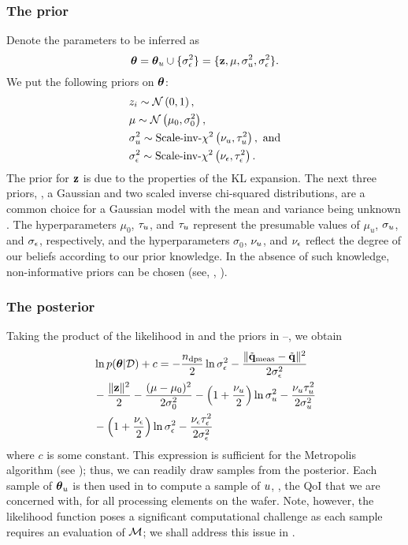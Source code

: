 \subsubsection{The prior}
Denote the parameters to be inferred as
\[
  {\boldsymbol\theta} = {\boldsymbol\theta}_u \cup \{ \sigma_\epsilon^2 \} = \{ \mathbf{z}, \mu, \sigma_u^2, \sigma_\epsilon^2 \}.
\]
We put the following priors on ${\boldsymbol\theta}$:
\begin{align}
  & \z_i \sim \gaussian{0}{1}, \elabel{z-prior} \\
  & \mu \sim \gaussian{\mu_0}{\sigma^2_0}, \elabel{mu-u-prior} \\
  & \sigma^2_\u \sim \sichisquared{\nu_\u}{\tau^2_\u}, \text{ and} \elabel{sigma2-u-prior} \\
  & \sigma^2_\noise \sim \sichisquared{\nu_\noise}{\tau^2_\noise}. \elabel{sigma2-noise-prior}
\end{align}
The prior for $\mathbf{z}$ is due to the properties of the KL expansion. The next three priors, \ie, a Gaussian and two scaled inverse chi-squared distributions, are a common choice for a Gaussian model with the mean and variance being unknown \cite{gelman2004}. The hyperparameters $\mu_0$, $\tau_u$, and $\tau_u$ represent the presumable values of $\mu_u$, $\sigma_u$, and $\sigma_\epsilon$, respectively, and the hyperparameters $\sigma_0$, $\nu_u$, and $\nu_\epsilon$ reflect the degree of our beliefs according to our prior knowledge. In the absence of such knowledge, non-informative priors can be chosen (see, \eg, \cite{gelman2004}).

\subsubsection{The posterior}
Taking the product of the likelihood in  and the priors in --, we obtain
\begin{align}
  & \ln \f{\vparam | \Data} + c = -\frac{\ndps}{2} \ln \sigma^2_\noise - \frac{\norm{\mvT_\meas - \mvT}^2}{2 \sigma^2_\noise} \nonumber \\
  & {} - \frac{\norm{\vz}^2}{2} - \frac{(\mu - \mu_0)^2}{2 \sigma^2_0} - \left(1 + \frac{\nu_\u}{2}\right) \ln \sigma^2_\u - \frac{\nu_\u \tau_\u^2}{2 \sigma^2_\u} \nonumber \\
  & {} - \left(1 + \frac{\nu_\noise}{2}\right) \ln \sigma^2_\noise - \frac{\nu_\noise \tau_\noise^2}{2 \sigma^2_\noise} \elabel{log-posterior}
\end{align}
where $c$ is some constant. This expression is sufficient for the Metropolis algorithm (see ); thus, we can readily draw samples from the posterior. Each sample of ${\boldsymbol\theta}_u$ is then used in  to compute a sample of $u$, \ie, the QoI that we are concerned with, for all processing elements on the wafer.
Note, however, the likelihood function poses a significant computational challenge as each sample requires an evaluation of $\model$; we shall address this issue in .
